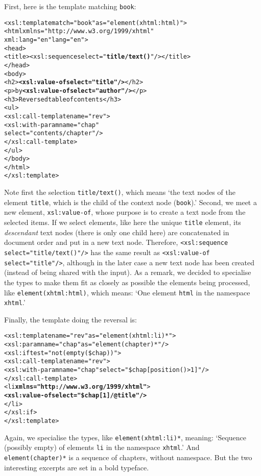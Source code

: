 \noindent First, here is the template matching \texttt{book}:
\begin{alltt}
  <xsl:template match="book" as="element(xhtml:html)">
    <html xmlns="http://www.w3.org/1999/xhtml"
          xml:lang="en" lang="en">
      <head>
        <title><xsl:sequence select="\textbf{title/text()}"/></title>
      </head>
      <body>
        <h2>\textbf{<xsl:value-of select="title"/>}</h2>
        <p>by \textbf{<xsl:value-of select="author"/>}</p>
        <h3>Reversed table of contents</h3>
        <ul>
          <xsl:call-template name="rev">
            <xsl:with-param name="chap"
                            select="contents/chapter"/>
          </xsl:call-template>
        </ul>
      </body>
    </html>
  </xsl:template>
\end{alltt}
Note first the selection \texttt{title/text()}, which means `the text
nodes of the element \texttt{title}, which is the child of the context
node (\texttt{book}).' Second, we meet a new \XSLT element,
\texttt{xsl:value-of}, whose purpose is to create a text node from the
selected items. If we select elements, like here the unique
\texttt{title} element, its \emph{descendant} text nodes (there is
only one child here) are concatenated in document order and put in a new
text node. Therefore, \texttt{<xsl:sequence select="title/text()"/>}
has the same result as \texttt{<xsl:value-of select="title"/>},
although in the later case a new text node has been created (instead
of being shared with the input). As a remark, we decided to specialise
the types to make them fit as closely as possible the elements being
processed, like \texttt{element(xhtml:html)}, which means: `One
element \texttt{html} in the namespace \texttt{xhtml}.'

Finally, the template doing the reversal is:
\begin{alltt}
  <xsl:template name="rev" as="element(xhtml:li)*">
    <xsl:param name="chap" as="element(chapter)*"/>
    <xsl:if test="not(empty(\$chap))">
      <xsl:call-template name="rev">
        \!\!<xsl:with-param name="chap"\!\! select="\$chap[position()>1]"/>
      </xsl:call-template>
      <li \textbf{xmlns="http://www.w3.org/1999/xhtml"}>
        \textbf{<xsl:value-of select="\$chap[1]/@title"/>}
      </li>
    </xsl:if>
  </xsl:template>
\end{alltt}
Again, we specialise the types, like \texttt{element(xhtml:li)*},
meaning: `Sequence (possibly empty) of elements \texttt{li} in the
namespace \texttt{xhtml}.' And \texttt{element(chapter)*} is a
sequence of chapters, without namespace. But the two interesting
excerpts are set in a bold typeface.

